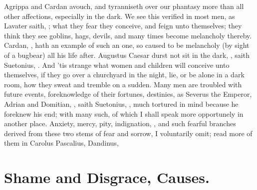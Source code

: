 Agrippa and Cardan avouch, and tyranniseth over our
phantasy more than all other affections, especially in the dark. We see this
verified in most men, as Lavater saith, ; what they fear they conceive, and feign unto themselves; they think
they see goblins, hags, devils, and many times become melancholy thereby.
Cardan, , hath an example of such an one,
so caused to be melancholy (by sight of a bugbear) all his life after. Augustus
Caesar durst not sit in the dark, , saith
Suetonius, . And 'tis
strange what women and children will conceive unto themselves, if they go over
a churchyard in the night, lie, or be alone in a dark room, how they sweat and
tremble on a sudden. Many men are troubled with future events, foreknowledge of
their fortunes, destinies, as Severus the Emperor, Adrian and Domitian,
, saith Suetonius, ,
much tortured in mind because he foreknew his end; with many such, of which I
shall speak more opportunely in another place. Anxiety,
mercy, pity, indignation, \etc{}, and such fearful branches derived from these
two stems of fear and sorrow, I voluntarily omit; read more of them in
Carolus Pascalius, Dandinus, \etc{}

\section{Shame and Disgrace, Causes.}

